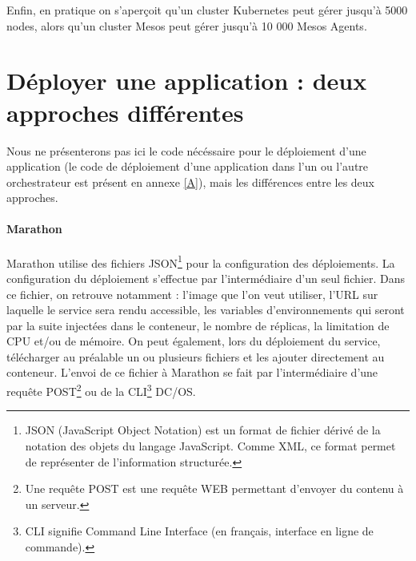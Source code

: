 \documentclass[11pt,fleqn]{book} %
\begin{document}
Enfin, en pratique on s'aperçoit qu'un cluster Kubernetes peut gérer jusqu'à 5000 nodes, alors qu'un cluster Mesos peut gérer jusqu'à 10 000 Mesos Agents.

\section{Déployer une application : deux approches différentes}
Nous ne présenterons pas ici le code nécéssaire pour le déploiement d'une application (le code de déploiement d'une application dans l'un ou l'autre orchestrateur est présent en annexe \ref{A}), mais les différences entre les deux approches.
\paragraph{Marathon}
 Marathon utilise des fichiers JSON\footnote{JSON (JavaScript Object Notation) est un format de fichier dérivé de la notation des objets du langage JavaScript. Comme XML, ce format permet de représenter de l’information structurée.} pour la configuration des déploiements. La configuration du déploiement s'effectue par l'intermédiaire d'un seul fichier. Dans ce fichier, on retrouve notamment : l'image que l'on veut utiliser, l'URL sur laquelle le service sera rendu accessible, les variables d'environnements qui seront par la suite injectées dans le conteneur, le nombre de réplicas, la limitation de CPU et/ou de mémoire. On peut également, lors du déploiement du service, télécharger au préalable un ou plusieurs fichiers et les ajouter directement au conteneur. L'envoi de ce fichier à Marathon se fait par l'intermédiaire d'une requête POST\footnote{Une requête POST est une requête WEB permettant d'envoyer du contenu à un serveur.} ou de la CLI\footnote{CLI signifie Command Line Interface (en français, interface en ligne de commande).} DC/OS.
 
\end{document}
